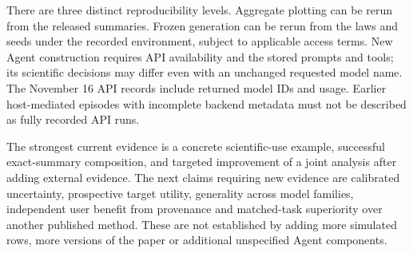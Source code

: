 \documentclass[11pt,letterpaper]{article}
\begin{document}
There are three distinct reproducibility levels. Aggregate plotting can be rerun from the released summaries. Frozen generation can be rerun from the laws and seeds under the recorded environment, subject to applicable access terms. New Agent construction requires API availability and the stored prompts and tools; its scientific decisions may differ even with an unchanged requested model name. The November 16 API records include returned model IDs and usage. Earlier host-mediated episodes with incomplete backend metadata must not be described as fully recorded API runs.


The strongest current evidence is a concrete scientific-use example, successful exact-summary composition, and targeted improvement of a joint analysis after adding external evidence. The next claims requiring new evidence are calibrated uncertainty, prospective target utility, generality across model families, independent user benefit from provenance and matched-task superiority over another published method. These are not established by adding more simulated rows, more versions of the paper or additional unspecified Agent components.
\end{document}
